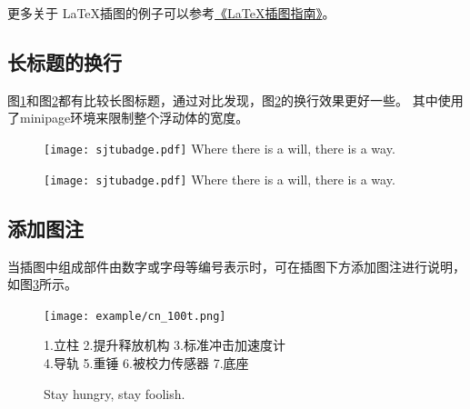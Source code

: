 更多关于 \LaTeX 插图的例子可以参考\href{http://www.cs.duke.edu/junhu/Graphics3.pdf}{《\LaTeX 插图指南》}。

\subsection{长标题的换行}
\label{sec:longcaption}

图\ref{fig:longcaptionbad}和图\ref{fig:longcaptiongood}都有比较长图标题，通过对比发现，图\ref{fig:longcaptiongood}的换行效果更好一些。
其中使用了minipage环境来限制整个浮动体的宽度。

\begin{figure}[!htp]
  \centering
  \texttt{[image: sjtubadge.pdf]}
    {Where there is a will, there is a way.}
 \label{fig:longcaptionbad}
\end{figure}

\begin{figure}[!htbp]
  \centering
  \begin{minipage}[b]{0.6\textwidth}
    \centering
    \texttt{[image: sjtubadge.pdf]}
      {Where there is a will, there is a way.}
    \label{fig:longcaptiongood}
  \end{minipage}
\end{figure}

\subsection{添加图注}

当插图中组成部件由数字或字母等编号表示时，可在插图下方添加图注进行说明，如图\ref{fig:cn_100t}所示。

\begin{figure}[!htp]
  \centering
  \texttt{[image: example/cn\_100t.png]}\
  \begin{center}
    \small\kaishu 1.立柱 2.提升释放机构 3.标准冲击加速度计 \\ 4.导轨 5.重锤 6.被校力传感器 7.底座
  \end{center}
  \vspace{-1em}
    {Stay hungry, stay foolish.}
 \label{fig:cn_100t}
\end{figure}

